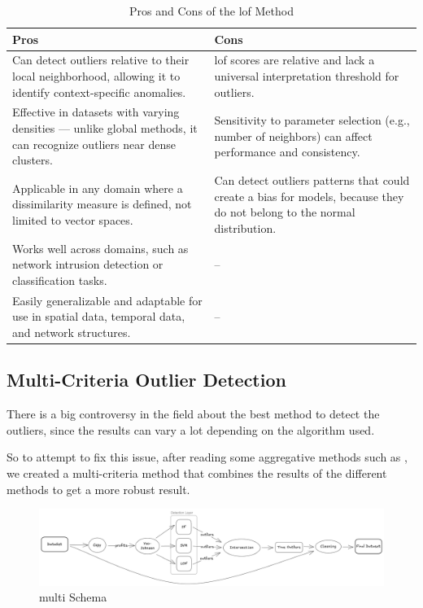 \documentclass[11pt,english,a4paper,hidelinks]{book}
\begin{document}
\begin{table}[H]
    \centering
    \caption{Pros and Cons of the \acrshort{lof} Method}
    \begin{tabular}{|p{7cm}|p{7cm}|}
    \hline
    \textbf{Pros} & \textbf{Cons} \\
    \hline
    Can detect outliers relative to their local neighborhood, allowing it to identify context-specific anomalies. & \acrshort{lof} scores are relative and lack a universal interpretation threshold for outliers. \\
    \hline
    Effective in datasets with varying densities — unlike global methods, it can recognize outliers near dense clusters. & Sensitivity to parameter selection (e.g., number of neighbors) can affect performance and consistency. \\
    \hline
    Applicable in any domain where a dissimilarity measure is defined, not limited to vector spaces. & Can detect outliers patterns that could create a bias for models, because they do not belong to the normal distribution. \\
    \hline
    Works well across domains, such as network intrusion detection or classification tasks. & -- \\
    \hline
    Easily generalizable and adaptable for use in spatial data, temporal data, and network structures. & -- \\
    \hline
    \end{tabular}
\end{table}
    
\subsection{Multi-Criteria Outlier Detection}

There is a big controversy in the field about the best method to detect the outliers, since the results can vary a lot depending on the algorithm used.

\vspace{0.5cm}
\noindent So to attempt to fix this issue, after reading some aggregative methods such as \textcite{abro2020stacking}, we created a multi-criteria method that combines the results of the different methods to get a more robust result.

\begin{figure}[H]
    \centering
    \includegraphics[width=1\textwidth]{images/code/outliers/multimodal.png}
    \caption{\acrshort{multi} Schema}
    \label{fig:multimodal}
\end{figure}
\end{document}
